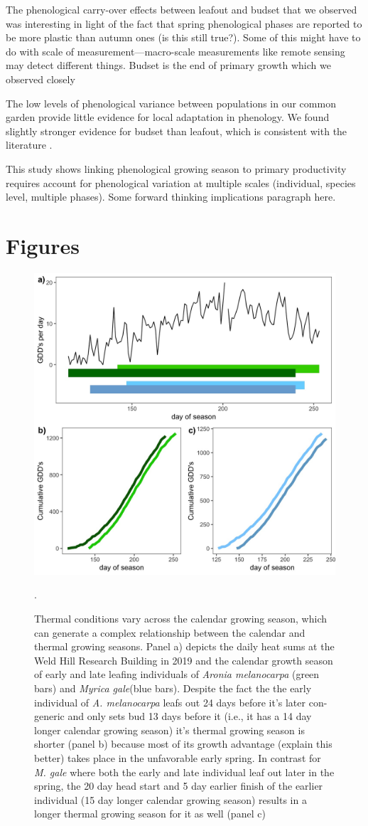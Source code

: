 \documentclass[12 pt]{article}
\begin{document}
The phenological carry-over effects between leafout and budset that we observed was interesting in light of the fact that spring phenological phases are reported to be more plastic than autumn ones (is this still true?). Some of this might have to do with scale of measurement---macro-scale measurements like remote sensing may detect different things. Budset is the end of primary growth which we observed closely   

The low levels of phenological variance between populations in our common garden provide little evidence for local adaptation in phenology. We found slightly stronger evidence for budset than leafout, which is consistent with the literature \citep{}. 

 This study shows linking phenological growing season to primary productivity requires account for phenological variation at multiple scales (individual, species level, multiple phases). Some forward thinking implications paragraph here.


\section{Figures}
\begin{figure}[h!]
    \centering
 \includegraphics[width=.5\textwidth]{..//analyses/figures/aronia_examp.jpeg}
    \caption{Thermal conditions vary across the calendar growing season, which can generate a complex relationship between the calendar and thermal growing seasons. Panel a) depicts the daily heat sums at the Weld Hill Research Building in 2019 and the calendar growth season of early and late leafing individuals of \emph{Aronia melanocarpa} (green bars) and \emph{Myrica gale}(blue bars). Despite the fact the the early individual of \emph{A. melanocarpa} leafs out 24 days before it's later con-generic and only sets bud 13 days before it (i.e., it has a 14 day longer calendar growing season) it's thermal growing season is shorter (panel b) because most of its growth advantage (explain this better) takes place in the unfavorable early spring. In contrast for \emph{M. gale} where both the early and late individual leaf out later in the spring, the 20 day head start and 5 day earlier finish of the earlier individual (15 day longer calendar growing season) results in a longer thermal growing season for it as well (panel c)}.
    \label{fig:concept}
\end{figure}
\end{document}
